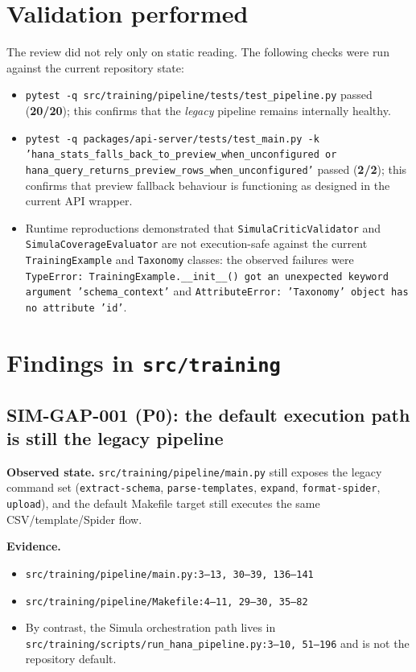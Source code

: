 \section{Validation performed}
The review did not rely only on static reading. The following checks
were run against the current repository state:
\begin{itemize}
  \item \texttt{pytest -q src/training/pipeline/tests/test\_pipeline.py}
    passed (\textbf{20/20}); this confirms that the \emph{legacy}
    pipeline remains internally healthy.
  \item \texttt{pytest -q packages/api-server/tests/test\_main.py -k
    'hana\_stats\_falls\_back\_to\_preview\_when\_unconfigured or
    hana\_query\_returns\_preview\_rows\_when\_unconfigured'} passed
    (\textbf{2/2}); this confirms that preview fallback behaviour is
    functioning as designed in the current API wrapper.
  \item Runtime reproductions demonstrated that
    \texttt{SimulaCriticValidator} and
    \texttt{SimulaCoverageEvaluator} are not execution-safe against
    the current \texttt{TrainingExample} and \texttt{Taxonomy}
    classes: the observed failures were
    \texttt{TypeError: TrainingExample.\_\_init\_\_() got an
    unexpected keyword argument 'schema\_context'} and
    \texttt{AttributeError: 'Taxonomy' object has no attribute 'id'}.
\end{itemize}

\section{Findings in \texttt{src/training}}

\subsection*{SIM-GAP-001 (P0): the default execution path is still the legacy pipeline}
\textbf{Observed state.}
\texttt{src/training/pipeline/main.py} still exposes the
legacy command set
(\texttt{extract-schema}, \texttt{parse-templates},
\texttt{expand}, \texttt{format-spider}, \texttt{upload}),
and the default Makefile target still executes the same
CSV/template/Spider flow.

\textbf{Evidence.}
\begin{itemize}
  \item \texttt{src/training/pipeline/main.py:3--13, 30--39,
    136--141}
  \item \texttt{src/training/pipeline/Makefile:4--11, 29--30,
    35--82}
  \item By contrast, the Simula orchestration path lives in
    \texttt{src/training/scripts/run\_hana\_pipeline.py:3--10,
    51--196} and is not the repository default.
\end{itemize}

